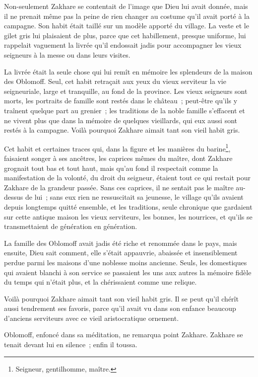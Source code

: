 \documentclass[french,twoside]{book} %
\begin{document}
Non-seulement Zakhare se contentait de l’image que Dieu lui avait donnée, mais il ne prenait même pas la peine de rien changer au costume qu’il avait porté à la campagne. Son habit était taillé sur un modèle apporté du village. La veste et le gilet gris lui plaisaient de plus, parce que cet habillement, presque uniforme, lui rappelait vaguement la livrée qu’il endossait jadis pour accompagner les vieux seigneurs à la messe ou dans leurs visites.\par
La livrée était la seule chose qui lui remît en mémoire les splendeurs de la maison des Oblomoff. Seul, cet habit retraçait aux yeux du vieux serviteur la vie seigneuriale, large et tranquille, au fond de la province. Les vieux seigneurs sont morts, les portraits de famille sont restés dans le château ; peut-être qu’ils y traînent quelque part au grenier ; les traditions de la noble famille s’effacent et ne vivent plus que dans la mémoire de quelques vieillards, qui eux aussi sont restés à la campagne. Voilà pourquoi Zakhare aimait tant son vieil habit gris.\par
Cet habit et certaines traces qui, dans la figure et les manières du barine\footnote{Seigneur, gentilhomme, maître.}, faisaient songer à ses ancêtres, les caprices mêmes du maître, dont Zakhare grognait tout bas et tout haut, mais qu’au fond il respectait comme la manifestation de la volonté, du droit du seigneur, étaient tout ce qui restait pour Zakhare de la grandeur passée. Sans ces caprices, il ne sentait pas le maître au-dessus de lui ; sans eux rien ne ressuscitait sa jeunesse, le village qu’ils avaient depuis longtemps quitté ensemble, et les traditions, seule chronique que gardaient sur cette antique maison les vieux serviteurs, les bonnes, les nourrices, et qu’ils se transmettaient de génération en génération.\par
La famille des Oblomoff avait jadis été riche et renommée dans le pays, mais ensuite, Dieu sait comment, elle s’était appauvrie, abaissée et insensiblement perdue parmi les maisons d’une noblesse moins ancienne. Seuls, les domestiques qui avaient blanchi à son service se passaient les uns aux autres la mémoire fidèle du temps qui n’était plus, et la chérissaient comme une relique.\par
Voilà pourquoi Zakhare aimait tant son vieil habit gris. Il se peut qu’il chérît aussi tendrement ses favoris, parce qu’il avait vu dans son enfance beaucoup d’anciens serviteurs avec ce vieil aristocratique ornement.\par
Oblomoff, enfoncé dans sa méditation, ne remarqua point Zakhare. Zakhare se tenait devant lui en silence ; enfin il toussa.\par
\end{document}
